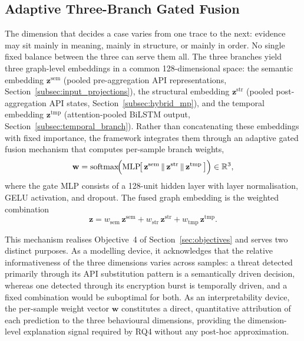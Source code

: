 \documentclass[%
    BCOR=10mm,
    DIV=13,
    toc=bibliography,
    toc=listof,
    oneside,
    12pt,
]{scrbook}
\begin{document}
\subsection{Adaptive Three-Branch Gated Fusion}
\label{subsec:fusion}

The dimension that decides a case varies from one trace to the next: evidence
may sit mainly in meaning, mainly in structure, or mainly in order. No single
fixed balance between the three can serve them all. The three branches yield
three graph-level embeddings in a common 128-di\-men\-sional space: the
semantic embedding
$\mathbf{z}^{\mathrm{sem}}$ (pooled pre-aggregation API representations,
Section~\ref{subsec:input_projections}), the structural embedding
$\mathbf{z}^{\mathrm{str}}$ (pooled post-aggregation API states,
Section~\ref{subsec:hybrid_mp}), and the temporal embedding
$\mathbf{z}^{\mathrm{tmp}}$ (attention-pooled BiLSTM output,
Section~\ref{subsec:temporal_branch}). Rather than concatenating these
embeddings with fixed importance, the framework integrates them through an
adaptive gated fusion mechanism that computes per-sample branch weights,
\begin{equation}
  \mathbf{w} = \mathrm{softmax}\!\Bigl(
    \mathrm{MLP}\!\bigl[\,
      \mathbf{z}^{\mathrm{sem}} \,\|\,
      \mathbf{z}^{\mathrm{str}} \,\|\,
      \mathbf{z}^{\mathrm{tmp}}
    \,\bigr]\Bigr) \in \mathbb{R}^{3},
  \label{eq:branch_gate}
\end{equation}
where the gate MLP consists of a 128-unit hidden layer with layer
normalisation, GELU activation, and dropout. The fused graph embedding is the
weighted combination
\begin{equation}
  \mathbf{z} = w_{\mathrm{sem}}\,\mathbf{z}^{\mathrm{sem}}
             + w_{\mathrm{str}}\,\mathbf{z}^{\mathrm{str}}
             + w_{\mathrm{tmp}}\,\mathbf{z}^{\mathrm{tmp}}.
  \label{eq:branch_fusion}
\end{equation}

This mechanism realises Objective~4 of Section~\ref{sec:objectives} and serves
two distinct purposes. As a modelling device, it acknowledges that the
relative informativeness of the three dimensions varies across samples: a
threat detected primarily through its API substitution pattern is a
semantically driven decision, whereas one detected through its encryption
burst is temporally driven, and a fixed combination would be suboptimal for
both. As an interpretability device, the per-sample weight vector $\mathbf{w}$
constitutes a direct, quantitative attribution of each prediction to the three
behavioural dimensions, providing the dimension-level explanation signal
required by RQ4 without any post-hoc approximation.
\end{document}
